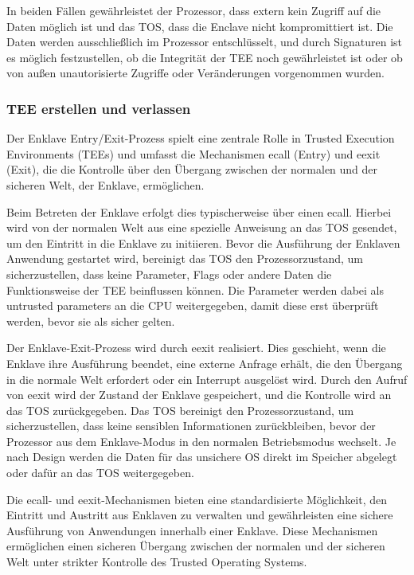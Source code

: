 \documentclass[sigconf]{acmart}
\begin{document}
In beiden Fällen gewährleistet der Prozessor, dass extern kein Zugriff auf die Daten möglich ist und das TOS, dass die Enclave nicht kompromittiert ist. Die Daten werden ausschließlich im Prozessor entschlüsselt, und durch Signaturen ist es möglich festzustellen, ob die Integrität der TEE noch gewährleistet ist oder ob von außen unautorisierte Zugriffe oder Veränderungen vorgenommen wurden.

\subsubsection{TEE erstellen und verlassen}
Der Enklave Entry/Exit-Prozess spielt eine zentrale Rolle in Trusted Execution Environments (TEEs) und umfasst die Mechanismen ecall (Entry) und eexit (Exit), die die Kontrolle über den Übergang zwischen der normalen und der sicheren Welt, der Enklave, ermöglichen.

Beim Betreten der Enklave erfolgt dies typischerweise über einen ecall. Hierbei wird von der normalen Welt aus eine spezielle Anweisung an das TOS gesendet, um den Eintritt in die Enklave zu initiieren. Bevor die Ausführung der Enklaven Anwendung gestartet wird, bereinigt das TOS den Prozessorzustand, um sicherzustellen, dass keine Parameter, Flags oder andere Daten die Funktionsweise der TEE beinflussen können. Die Parameter werden dabei als untrusted parameters an die CPU weitergegeben, damit diese erst überprüft werden, bevor sie als sicher gelten.

Der Enklave-Exit-Prozess wird durch eexit realisiert. Dies geschieht, wenn die Enklave ihre Ausführung beendet, eine externe Anfrage erhält, die den Übergang in die normale Welt erfordert oder ein Interrupt ausgelöst wird. Durch den Aufruf von eexit wird der Zustand der Enklave gespeichert, und die Kontrolle wird an das TOS zurückgegeben. Das TOS bereinigt den Prozessorzustand, um sicherzustellen, dass keine sensiblen Informationen zurückbleiben, bevor der Prozessor aus dem Enklave-Modus in den normalen Betriebsmodus wechselt. Je nach Design werden die Daten für das unsichere OS direkt im Speicher abgelegt oder dafür an das TOS weitergegeben.

Die ecall- und eexit-Mechanismen bieten eine standardisierte Möglichkeit, den Eintritt und Austritt aus Enklaven zu verwalten und gewährleisten eine sichere Ausführung von Anwendungen innerhalb einer Enklave. Diese Mechanismen ermöglichen einen sicheren Übergang zwischen der normalen und der sicheren Welt unter strikter Kontrolle des Trusted Operating Systems.
\end{document}
